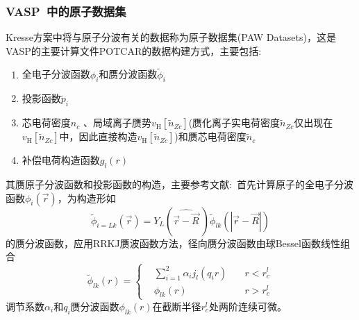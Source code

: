 

\subsubsection{VASP~中的原子数据集}
\textrm{Kresse}方案中将与原子分波有关的数据称为原子数据集(\textrm{PAW Datasets})，这是\textrm{VASP}的主要计算文件\textrm{POTCAR}的数据构建方式，主要包括:~
\begin{enumerate}
	\item 全电子分波函数$\phi_i$和赝分波函数$\tilde\phi_i$
	\item 投影函数$\tilde p_i$
	\item 芯电荷密度$n_c$ 、局域离子赝势$v_{\mathrm H}[\tilde n_{Zc}]$(赝化离子实电荷密度$\tilde n_{Zc}$仅出现在$v_{\mathrm H}[\tilde n_{Zc}]$中，因此直接构造$v_{\mathrm H}[\tilde n_{Zc}]$)和赝芯电荷密度$\tilde n_c$
	\item 补偿电荷构造函数$g_l(r)$
\end{enumerate}

其赝原子分波函数和投影函数的构造，主要参考文献\cite{JPCM6-8245_1994}:~首先计算原子的全电子分波函数$\phi_i(\vec r)$，为构造形如
	\begin{equation}
		\tilde\phi_{i=Lk}(\vec r)=Y_L(\widehat{\vec r-\vec R}~)\tilde\phi_{lk}(|\vec r-\vec R|)
	\end{equation}
	的赝分波函数，应用\textrm{RRKJ}赝波函数方法，径向赝分波函数由球\textrm{Bessel}函数线性组合
	\begin{equation}
		\tilde\phi_{lk}(r)=\left\{
		\begin{aligned}
			&\sum_{i=1}^2\alpha_ij_l(q_ir)\quad &r<r_c^l\\
			&\phi_{lk}(r)\quad&r>r_c^l
		\end{aligned}
		\right.
	\end{equation}
调节系数$\alpha_i$和$q_i$赝分波函数$\phi_{lk}(r)$在截断半径$r_c^l$处两阶连续可微。

